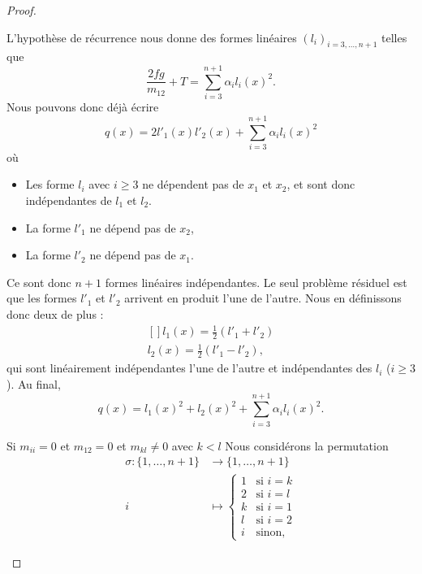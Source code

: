 \begin{proof}
\begin{subproof}
		L'hypothèse de récurrence nous donne des formes linéaires \( (l_i)_{i=3,\ldots, n+1}\) telles que
		\begin{equation}
			\frac{ 2fg }{ m_{12} }+T=\sum_{i=3}^{n+1}\alpha_il_i(x)^2.
		\end{equation}
		Nous pouvons donc déjà écrire
		\begin{equation}
			q(x)=2l'_1(x)l'_2(x)+\sum_{i=3}^{n+1}\alpha_il_i(x)^2
		\end{equation}
		où
		\begin{itemize}
			\item Les forme \( l_i\) avec \( i\geq 3\) ne dépendent pas de \( x_1\) et \( x_2\), et sont donc indépendantes de \( l_1\) et \( l_2\).
			\item La forme \( l'_1\) ne dépend pas de \( x_2\),
			\item La forme \( l'_2\) ne dépend pas de \( x_1\).
		\end{itemize}
		Ce sont donc \( n+1\) formes linéaires indépendantes. Le seul problème résiduel est que les formes \( l'_1\) et \( l'_2\) arrivent en produit l'une de l'autre. Nous en définissons donc deux de plus :
		\begin{equation}
			\begin{aligned}[]
				l_1(x)=\frac{ 1 }{2}(l'_1+l'_2) \\
				l_2(x)=\frac{ 1 }{2}(l'_1-l'_2),
			\end{aligned}
		\end{equation}
		qui sont linéairement indépendantes l'une de l'autre et indépendantes des \( l_i\) (\( i\geq 3\)). Au final,
		\begin{equation}
			q(x)=l_1(x)^2+l_2(x)^2+\sum_{i=3}^{n+1}\alpha_il_i(x)^2.
		\end{equation}
		\item[Si \( m_{ii}=0\) et \( m_{12}=0\) et \( m_{kl}\neq 0\) avec \( k<l\)]
		Nous considérons la permutation
		\begin{equation}
			\begin{aligned}
				\sigma\colon \{ 1,\ldots, n+1 \} & \to \{ 1,\ldots, n+1 \}             \\
				i                                & \mapsto \begin{cases}
					1 & \text{si } i=k \\
					2 & \text{si } i=l \\
					k & \text{si } i=1 \\
					l & \text{si } i=2 \\
					i & \text{sinon,}
				\end{cases}

\end{aligned}
\end{equation}
\end{subproof}
\end{proof}
